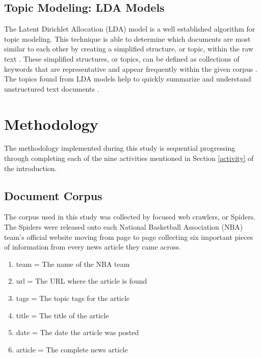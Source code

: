 \documentclass[5p,authoryear]{elsarticle}
\begin{document}
\subsection{Topic Modeling: LDA Models}\label{topic}

The Latent Dirichlet Allocation (LDA) model is a well established algorithm for topic modeling. 
This technique is able to determine which documents are most similar to each other by creating a simplified structure, or topic, within the raw text \citep{handsOn}.
These simplified structures, or topics, can be defined as collections of keywords that are representative and appear frequently within the given corpus \citep{sample-code2}. 
The topics found from LDA models help to quickly summarize and understand unstructured text documents \citep{handsOn}.

\clearpage

\section{Methodology}\label{meth}


The methodology implemented during this study is sequential progressing through completing each of the nine activities mentioned in Section \ref{activity} of the introduction. 


\subsection{Document Corpus}\label{corpus}

The corpus used in this study was collected by focused web crawlers, or Spiders. The Spiders were released onto each National Basketball Association (NBA) team's official website moving from page to page collecting six important pieces of information from every news article they came across.

\begin{enumerate}
 \item team  = The name of the NBA team
 \item url = The URL where the article is found
 \item tags = The topic tags for the article
 \item title = The title of the article
 \item date = The date the article was posted
 \item article = The complete news article
\end{enumerate} \\
\end{document}
